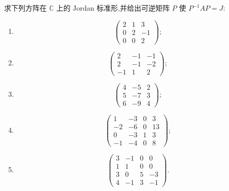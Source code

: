 \begin{example}
求下列方阵在 $\mathbb{C}$ 上的 Jordan 标准形,并给出可逆矩阵 $P$
使 $P^{-1}AP=J$:
\begin{enumerate}
    \item
    \[
    \begin{pmatrix}
    2&1&3\\
    0&2&-1\\
    0&0&2
    \end{pmatrix};
    \]
    \item
    \[
    \begin{pmatrix}
    2&-1&-1\\
    2&-1&-2\\
    -1&1&2
    \end{pmatrix};
    \]
    \item
    \[
    \begin{pmatrix}
    4&-5&2\\
    5&-7&3\\
    6&-9&4
    \end{pmatrix};
    \]
    \item
    \[
    \begin{pmatrix}
    1&-3&0&3\\
    -2&-6&0&13\\
    0&-3&1&3\\
    -1&-4&0&8
    \end{pmatrix};
    \]
    \item
    \[
    \begin{pmatrix}
    3&-1&0&0\\
    1&1&0&0\\
    3&0&5&-3\\
    4&-1&3&-1
    \end{pmatrix}.
    \]
\end{enumerate}
\end{example}
\exampleblank


